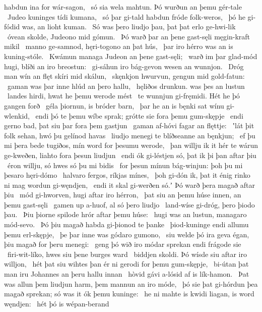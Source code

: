 habdun ina for wár-sagon, \hld\ só sia wela mahtun.
Þó wurðun an þemu gér-tale \hld\ Judeo kuninges
tídi kumana, \hld\ só þar gi-tald habdun
fróde folk-weros, \hld\ þó he gi-fódid was,
an lioht kuman. \hld\ Só was þero liudjo þau,
þat þat erlo ge-hwi-lik \hld\ óvean skolde,
Judeono mid gómun. \hld\ Þó warð þar an þene gast-sęli
męgin-kraft mikil \hld\ manno ge-samnod,
hęri-togono an þat hús, \hld\ þar iro hérro was
an is kuning-stóle. \hld\ Kwámun managa
Judeon an þene gast-sęli; \hld\ warð im þar glad-mód hugi,
blíði an iro breostun: \hld\ gi-sáhun iro bág-gevon
wesen an wunnjon. \hld\ Dróg man wín an flęt
skíri mid skálun, \hld\ skęnkjon hwurvun,
gengun mid gold-fatun: \hld\ gaman was þar inne
hlúd an þero hallu, \hld\ hęliðos drunkun.
was þes an lustun \hld\ landes hirdi,
hwat he þemu werode mést \hld\ te wunnjun gi-fręmidi.
Hét he þó gangen forð \hld\ géla þiornun,
is bróder barn, \hld\ þar he an is bęnki sat
wínu gi-wlenkid, \hld\ endi þó te þemu wíbe sprak;
grótte sie fora þemu gum-skępje \hld\ endi gerno bad,
þat siu þar fora þem gastjun \hld\ gaman af-hóvi
fagar an flęttje: \hld\ ʽlát þit folk sehan,
hwó þu gelínod havas \hld\ liudjo menegi
te blíðseanne an bęnkjun; \hld\ ef þu mi þera bede tugiðos,
mín word for þesumu werode, \hld\ þan willju ik it hér te wárun ge-kweðen,
liahto fora þesun liudjun \hld\ endi ók gi-léstjen só,
þat ik þi þan aftar þiu \hld\ éron willju,
só hwes só þu mi bidis \hld\ for þesun mínun bág-winjun:
þoh þu mi þesaro hęri-dómo \hld\ halvaro fergos,
ríkjas mínes, \hld\ þoh gi-dón ik, þat it énig rinko ni mag
wordun gi-węndjen, \hld\ endi it skal gi-werðen só.ʼ
Þó warð þera magað aftar þiu \hld\ mód gi-hworven,
hugi aftar iro hérron, \hld\ þat siu an þemu húse innen,
an þemu gast-sęli \hld\ gamen up a-huof,
al só þero liudjo \hld\ land-wíse gi-dróg,
þero þiodo þau. \hld\ Þiu þiorne spilode
hrór aftar þemu húse: \hld\ hugi was an lustun,
managaro mód-sevo. \hld\ Þó þiu magað habda
gi-þionod te þanke \hld\ þiod-kuninge
endi allumu þemu erl-skępje, \hld\ þe þar inne was
gódaro gumono, \hld\ siu welde þó ira geva égan,
þiu magað for þeru menegi: \hld\ geng þó wið iro módar sprekan
endi frágode sie \hld\ firi-wit-líko,
hwes siu þene burges ward \hld\ biddjen skoldi.
Þó wísde siu aftar iro willjon, \hld\ hét þat siu wihtes þan ér
ni gerodi for þemu gum-skępje, \hld\ bi-útan þat man iru Johannes
an þeru hallu innan \hld\ hòvid gávi
a-lósid af is lík-hamon. \hld\ Þat was allun þem liudjun harm,
þem mannun an iro móde, \hld\ þó sie þat gi-hórdun þea magað sprekan;
só was it ók þemu kuninge: \hld\ he ni mahte is kwidi liagan,
is word węndjen: \hld\ hét þó is wépan-berand
